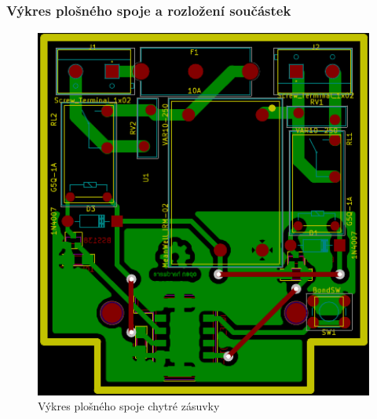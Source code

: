 \documentclass[12pt,a4paper,oneside]{article}
\begin{document}
\subsubsection{Výkres plošného spoje a rozložení součástek}

\begin{figure}[H]
\label{fig:board}
\minipage{\textwidth}
\includegraphics[width = 128mm]{img/board.pdf}
\caption{Výkres plošného spoje chytré zásuvky}
\endminipage
\end{figure}
\end{document}
